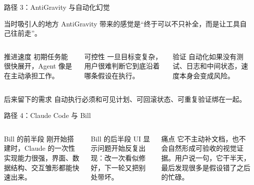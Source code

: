 \documentclass[theme=workflow,aspectratio=169,fontset=tech]{Hypo-Slide}
\begin{document}
\begin{frame}{路径 3：AntiGravity 与自动化幻觉}
  \begin{block}{当时吸引人的地方}
    AntiGravity 带来的感觉是“终于可以不只补全，而是让工具自己往前走”。
  \end{block}
  \begin{columns}[T,totalwidth=\textwidth]
    \begin{block}{推进速度}
      初期任务能很快展开，Agent 像是在主动承担工作。
    \end{block}
    \begin{block}{可控性}
      一旦目标变复杂，用户很难判断它到底沿着哪条假设在执行。
    \end{block}
    \begin{block}{验证}
      自动化如果没有测试、日志和中间状态，速度本身会变成风险。
    \end{block}
  \end{columns}
  \vspace{0.25cm}
  \begin{alertblock}{后来留下的需求}
    自动执行必须和可见计划、可回滚状态、可重复验证绑在一起。
  \end{alertblock}
\end{frame}

\begin{frame}{路径 4：Claude Code 与 Bill}
  \begin{columns}[T,totalwidth=\textwidth]
    \begin{block}{Bill 的前半段}
      刚开始搭建时，Claude 的一次性实现能力很强，界面、数据结构、交互雏形都能快速出来。
    \end{block}
    \begin{block}{Bill 的后半段}
      UI 显示问题开始反复出现：改一次看似修好，下一轮又把别处带坏。
    \end{block}
    \begin{alertblock}{痛点}
      它不主动补文档，也不会自然形成可验收的视觉证据。用户说一句，它干半天，最后发现很多是假设错了之后的忙碌。
    \end{alertblock}
  \end{columns}
\end{frame}
\end{document}
